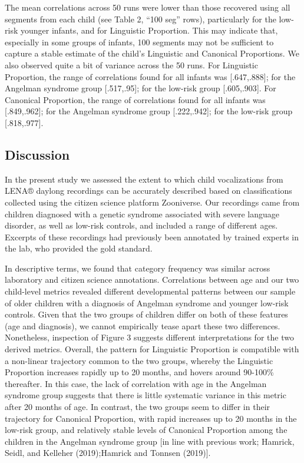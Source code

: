 \documentclass[
  english,
  ,man]{apa6}
\begin{document}
The mean correlations across 50 runs were lower than those recovered using all segments from each child (see Table 2, ``100 seg'' rows), particularly for the low-risk younger infants, and for Linguistic Proportion. This may indicate that, especially in some groups of infants, 100 segments may not be sufficient to capture a stable estimate of the child's Linguistic and Canonical Proportions. We also observed quite a bit of variance across the 50 runs. For Linguistic Proportion, the range of correlations found for all infants was {[}.647,.888{]}; for the Angelman syndrome group {[}.517,.95{]}; for the low-risk group {[}.605,.903{]}. For Canonical Proportion, the range of correlations found for all infants was {[}.849,.962{]}; for the Angelman syndrome group {[}.222,.942{]}; for the low-risk group {[}.818,.977{]}.

\hypertarget{discussion}{%
\subsection{Discussion}\label{discussion}}

In the present study we assessed the extent to which child vocalizations from LENA® daylong recordings can be accurately described based on classifications collected using the citizen science platform Zooniverse. Our recordings came from children diagnosed with a genetic syndrome associated with severe language disorder, as well as low-risk controls, and included a range of different ages. Excerpts of these recordings had previously been annotated by trained experts in the lab, who provided the gold standard.

In descriptive terms, we found that category frequency was similar across laboratory and citizen science annotations. Correlations between age and our two child-level metrics revealed different developmental patterns between our sample of older children with a diagnosis of Angelman syndrome and younger low-risk controls. Given that the two groups of children differ on both of these features (age and diagnosis), we cannot empirically tease apart these two differences. Nonetheless, inspection of Figure 3 suggests different interpretations for the two derived metrics. Overall, the pattern for Linguistic Proportion is compatible with a non-linear trajectory common to the two groups, whereby the Linguistic Proportion increases rapidly up to 20 months, and hovers around 90-100\% thereafter. In this case, the lack of correlation with age in the Angelman syndrome group suggests that there is little systematic variance in this metric after 20 months of age. In contrast, the two groups seem to differ in their trajectory for Canonical Proportion, with rapid increases up to 20 months in the low-risk group, and relatively stable levels of Canonical Proportion among the children in the Angelman syndrome group {[}in line with previous work; Hamrick, Seidl, and Kelleher (2019);Hamrick and Tonnsen (2019){]}.
\end{document}
